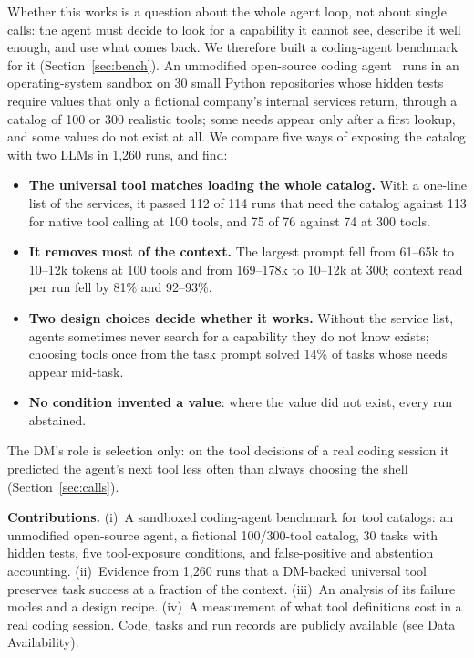 \documentclass[conference]{IEEEtran}
\begin{document}
Whether this works is a question about the whole agent loop, not about single calls: the agent must decide
to look for a capability it cannot see, describe it well enough, and use what comes back. We therefore built
a coding-agent benchmark for it (Section~\ref{sec:bench}). An unmodified open-source coding
agent~\cite{opencode} runs in an operating-system sandbox on 30 small Python repositories whose hidden tests
require values that only a fictional company's internal services return, through a catalog of 100 or 300
realistic tools; some needs appear only after a first lookup, and some values do not exist at all. We compare
five ways of exposing the catalog with two LLMs in 1,260 runs, and find:
\begin{itemize}
\item \textbf{The universal tool matches loading the whole catalog.} With a one-line list of the services, it
passed 112 of 114 runs that need the catalog against 113 for native tool calling at 100 tools, and 75 of 76
against 74 at 300 tools.
\item \textbf{It removes most of the context.} The largest prompt fell from 61--65k to 10--12k tokens at 100
tools and from 169--178k to 10--12k at 300; context read per run fell by 81\% and 92--93\%.
\item \textbf{Two design choices decide whether it works.} Without the service list, agents sometimes never
search for a capability they do not know exists; choosing tools once from the task prompt solved 14\% of
tasks whose needs appear mid-task.
\item \textbf{No condition invented a value}: where the value did not exist, every run abstained.
\end{itemize}
The DM's role is selection only: on the tool decisions of a real coding session it predicted the agent's next
tool less often than always choosing the shell (Section~\ref{sec:calls}).

\textbf{Contributions.} (i)~A sandboxed coding-agent benchmark for tool catalogs: an unmodified open-source
agent, a fictional 100/300-tool catalog, 30 tasks with hidden tests, five tool-exposure conditions, and
false-positive and abstention accounting. (ii)~Evidence from 1,260 runs that a DM-backed universal tool
preserves task success at a fraction of the context. (iii)~An analysis of its failure modes and a design
recipe. (iv)~A measurement of what tool definitions cost in a real coding session. Code, tasks and run
records are publicly available (see Data Availability).
\end{document}

